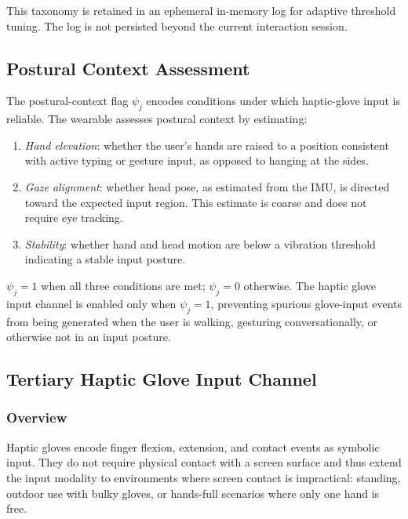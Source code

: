 \documentclass[11pt,letterpaper]{article}
\begin{document}
This taxonomy is retained in an ephemeral in-memory log for adaptive threshold
tuning. The log is not persisted beyond the current interaction session.

\subsection{Postural Context Assessment}
\label{sec:posture}

The postural-context flag $\psi_j$ encodes conditions under which haptic-glove input
is reliable. The wearable assesses postural context by estimating:

\begin{enumerate}[leftmargin=2em, label=\arabic*.]
  \item \emph{Hand elevation}: whether the user's hands are raised to a position
        consistent with active typing or gesture input, as opposed to hanging at the
        sides.
  \item \emph{Gaze alignment}: whether head pose, as estimated from the IMU,
        is directed toward the expected input region. This estimate is coarse and
        does not require eye tracking.
  \item \emph{Stability}: whether hand and head motion are below a vibration
        threshold indicating a stable input posture.
\end{enumerate}

$\psi_j = 1$ when all three conditions are met; $\psi_j = 0$ otherwise. The haptic
glove input channel is enabled only when $\psi_j = 1$, preventing spurious
glove-input events from being generated when the user is walking, gesturing
conversationally, or otherwise not in an input posture.

\subsection{Tertiary Haptic Glove Input Channel}

\subsubsection{Overview}

Haptic gloves encode finger flexion, extension, and contact events as symbolic
input. They do not require physical contact with a screen surface and thus extend
the input modality to environments where screen contact is impractical: standing,
outdoor use with bulky gloves, or hands-full scenarios where only one hand is free.
\end{document}
